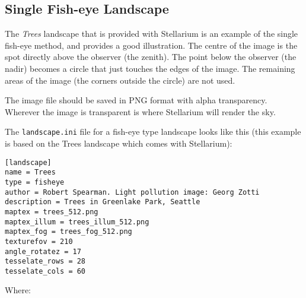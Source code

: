\subsection{Single Fish-eye Landscape}\label{single-fish-eye-method}

The \emph{Trees} landscape that is provided with Stellarium is an
example of the single fish-eye method, and provides a good illustration.
The centre of the image is the spot directly above the observer (the
zenith). The point below the observer (the nadir) becomes a circle that
just touches the edges of the image. The remaining areas of the image
(the corners outside the circle) are not used.

The image file should be saved in PNG format with alpha transparency.
Wherever the image is transparent is where Stellarium will render the
sky.

The \texttt{landscape.ini} file for a fish-eye type landscape looks like
this (this example is based on the Trees landscape which comes with
Stellarium):

\begin{config}
\texttt{{[}landscape{]}}\\
\texttt{name~=~Trees}\\
\texttt{type~=~fisheye}\\
\texttt{author~=~Robert~Spearman.~Light~pollution~image:~Georg~Zotti}\\
\texttt{description~=~Trees~in~Greenlake~Park,~Seattle}\\
\texttt{maptex~=~trees\_512.png}\\
\texttt{maptex\_illum~=~trees\_illum\_512.png}\\
\texttt{maptex\_fog~=~trees\_fog\_512.png}\\
\texttt{texturefov~=~210}\\
\texttt{angle\_rotatez~=~17}\\
\texttt{tesselate\_rows~=~28}\\
\texttt{tesselate\_cols~=~60}
\end{config}

Where:

